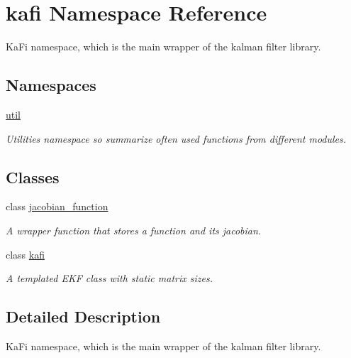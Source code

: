 \hypertarget{namespacekafi}{}\section{kafi Namespace Reference}
\label{namespacekafi}


Ka\+Fi namespace, which is the main wrapper of the kalman filter library.  


\subsection*{Namespaces}
\begin{DoxyCompactItemize}
\item 
 \hyperlink{namespacekafi_1_1util}{util}
\begin{DoxyCompactList}\small\item\em Utilities namespace so summarize often used functions from different modules. \end{DoxyCompactList}\end{DoxyCompactItemize}
\subsection*{Classes}
\begin{DoxyCompactItemize}
\item 
class \hyperlink{classkafi_1_1jacobian__function}{jacobian\+\_\+function}
\begin{DoxyCompactList}\small\item\em A wrapper function that stores a function and its jacobian. \end{DoxyCompactList}\item 
class \hyperlink{classkafi_1_1kafi}{kafi}
\begin{DoxyCompactList}\small\item\em A templated E\+KF class with static matrix sizes. \end{DoxyCompactList}\end{DoxyCompactItemize}


\subsection{Detailed Description}
Ka\+Fi namespace, which is the main wrapper of the kalman filter library. 

